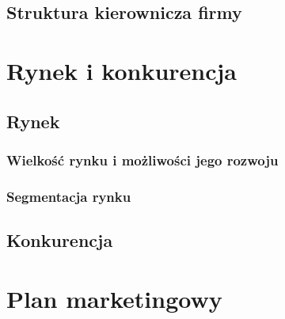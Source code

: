 \documentclass[12pt]{article}
\begin{document}
\subsection{Struktura kierownicza firmy}

\section{Rynek i konkurencja}

\subsection{Rynek}

\subsubsection{Wielkość rynku i możliwości jego rozwoju}


\subsubsection{Segmentacja rynku}


\subsection{Konkurencja}


\section{Plan marketingowy}
\end{document}
